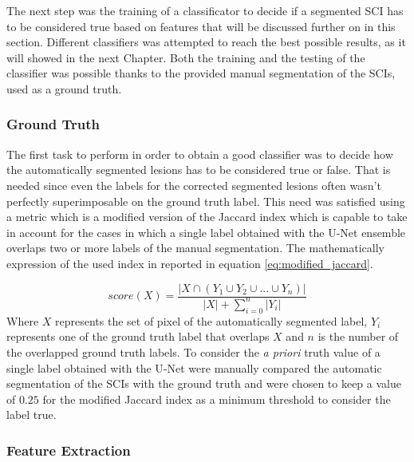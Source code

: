 \documentclass{standalone}
\begin{document}
The next step was the training of a classificator to decide if a segmented SCI has to be considered true based on features that will be discussed further on in this section.
Different classifiers was attempted to reach the best possible results, as it will showed in the next Chapter.
Both the training and the testing of the classifier was possible thanks to the provided manual segmentation of the SCIs, used as a ground truth.

\subsubsection{Ground Truth}
The first task to perform in order to obtain a good classifier was to decide how the automatically segmented lesions has to be considered true or false. That is needed since even the labels for the corrected segmented lesions often wasn't perfectly superimposable on the ground truth label.
This need was satisfied using a metric which is a modified version of the Jaccard index which is capable to take in account for the cases in which a single label obtained with the U-Net ensemble overlaps two or more labels of the manual segmentation.
The mathematically expression of the used index in reported in equation \ref{eq:modified_jaccard}.

\begin{equation} \label{eq:modified_jaccard}
    score(X) = \frac{|X \cap (Y_1 \cup Y_2 \cup ... \cup Y_n)|}
    {|X| + \sum_{i=0}^{n} |Y_i|}
\end{equation}
Where $X$ represents the set of pixel of the automatically segmented label, $Y_i$ represents one of the ground truth label that overlaps $X$ and $n$ is the number of the overlapped ground truth labels.
To consider the \textit{a priori} truth value of a single label obtained with the U-Net were manually compared the automatic segmentation of the SCIs with the ground truth and were chosen to keep a value of $0.25$ for the modified Jaccard index as a minimum threshold to consider the label true.

\subsubsection{Feature Extraction}
\end{document}
